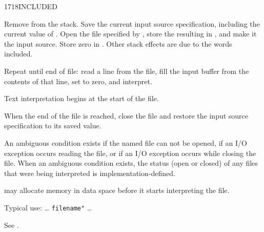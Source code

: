\vspace*{-6ex}
\begin{worddef}{1718}{INCLUDED}
\item {}

	Remove  from the stack. Save the current input
	source specification, including the current value of
	. Open the file specified by ,
	store the resulting  in , and make
	it the input source. Store zero in . Other
	stack effects are due to the words included.

	Repeat until end of file: read a line from the file, fill the
	input buffer from the contents of that line, set 
	to zero, and interpret.

	Text interpretation begins at the start of the file.

	When the end of the file is reached, close the file and restore
	the input source specification to its saved value.

	An ambiguous condition exists if the named file can not be
	opened, if an I/O exception occurs reading the file, or if an
	I/O exception occurs while closing the file. When an ambiguous
	condition exists, the status (open or closed) of any files that
	were being interpreted is implementation-defined.

	 may allocate memory in data space before it
	starts interpreting the file.


	\begin{rationale} %
		Typical use:
			{\ldots}  \texttt{filename"}  {\ldots}
	\end{rationale}

	\begin{testing} %
		See .
	\end{testing}
\end{worddef}

